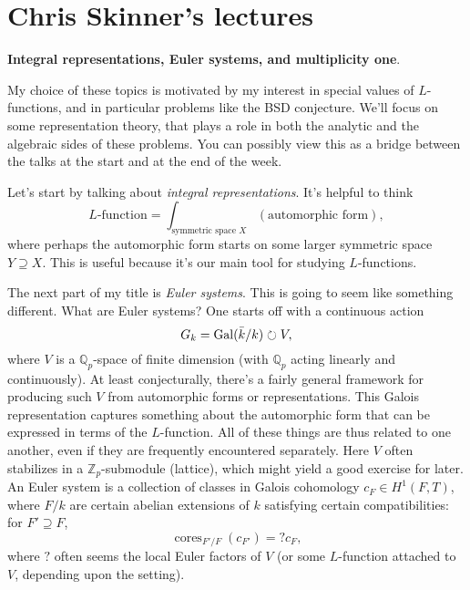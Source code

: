 \documentclass[reqno]{amsart} 
\numberwithin{theorem}{section}
\numberwithin{equation}{section}
\numberwithin{exercise}{section}
\begin{document}
\section{Chris Skinner's lectures}\label{sec:cq6tho1vem}
\textbf{Integral representations, Euler systems, and multiplicity one}.

My choice of these topics is motivated by my interest in special values of $L$-functions, and in particular problems like the BSD conjecture.  We'll focus on some representation theory, that plays a role in both the analytic and the algebraic sides of these problems.  You can possibly view this as a bridge between the talks at the start and at the end of the week.

Let's start by talking about \emph{integral representations}.  It's helpful to think
\begin{equation*}
  \text{$L$-function} =
  \int_{\text{symmetric space } X}
  (\text{automorphic form}),
\end{equation*}
where perhaps the automorphic form starts on some larger symmetric space $Y \supseteq X$.  This is useful because it's our main tool for studying $L$-functions.

The next part of my title is \emph{Euler systems}.  This is going to seem like something different.  What are Euler systems?  One starts off with a continuous action
\begin{equation*}
  G_k = \operatorname{Gal}(\bar{k} / k) \circlearrowright V,
\end{equation*}
where $V$ is a $\mathbb{Q}_p$-space of finite dimension (with $\mathbb{Q}_p$ acting linearly and continuously).  At least conjecturally, there's a fairly general framework for producing such $V$ from automorphic forms or representations.  This Galois representation captures something about the automorphic form that can be expressed in terms of the $L$-function.  All of these things are thus related to one another, even if they are frequently encountered separately.  Here $V$ often stabilizes in a $\mathbb{Z}_p$-submodule (lattice), which might yield a good exercise for later.  An Euler system is a collection of classes in Galois cohomology $c_F \in H^1(F, T)$, where $F / k$ are certain abelian extensions of $k$ satisfying certain compatibilities: for $F' \supseteq F$,
\begin{equation*}
  \operatorname{cores}_{F' / F}(c_{F '}) = ? c_F,
\end{equation*}
where $?$ often seems the local Euler factors of $V$ (or some $L$-function attached to $V$, depending upon the setting).
\end{document}
